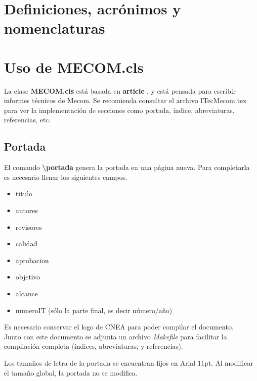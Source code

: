 \documentclass[a4paper,11pt,twoside]{MECOM}
\begin{document}
    \portada
    
    \tableofcontents    
    
    \section{Definiciones, acr\'onimos y nomenclaturas}
        \printnomenclature[2cm]
        
    \section{Uso de MECOM.cls}
    La clase {\bf MECOM.cls} est\'a basada en {\bf article} \cite{hefferon_minutes_2005}, y est\'a pensada para escribir informes t\'ecnicos de Mecom. Se recomienda consultar el archivo ITec\textunderscore Mecom.tex para ver la implementaci\'on de secciones como portada, \'indice, abreviaturas, referencias, etc.
    
    \subsection{Portada}
        El comando {\bf \textbackslash portada} genera la portada en una p\'agina nueva. Para completarla es necesario llenar los siguientes campos.
        \begin{itemize}
            \item titulo
            \item autores
            \item revisores
            \item calidad
            \item aprobacion
            \item objetivo
            \item alcance
            \item numeroIT (s\'olo la parte final, es decir n\'umero/a\~no)
        \end{itemize}
        \par
        Es necesario conservar el logo de CNEA para poder compilar el documento. Junto con este documento se adjunta un archivo \emph{Makefile} para facilitar la compilaci\'on completa (\'indices, abreviaturas, y referencias).
        \par
        Los tama\~nos de letra de la portada se encuentran fijos en Arial 11pt. Al modificar el tama\~no global, la portada no se modifica.
        
\end{document}
